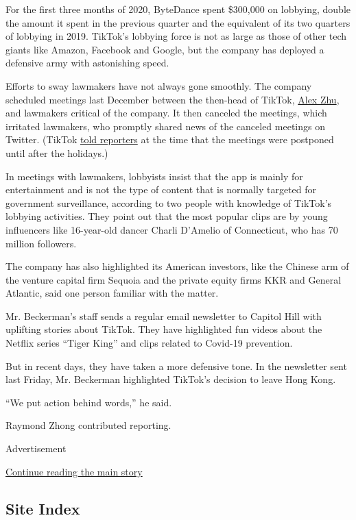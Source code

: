 For the first three months of 2020, ByteDance spent \$300,000 on
lobbying, double the amount it spent in the previous quarter and the
equivalent of its two quarters of lobbying in 2019. TikTok's lobbying
force is not as large as those of other tech giants like Amazon,
Facebook and Google, but the company has deployed a defensive army with
astonishing speed.

Efforts to sway lawmakers have not always gone smoothly. The company
scheduled meetings last December between the then-head of TikTok,
\href{https://www.nytimes3xbfgragh.onion/2019/11/18/technology/tiktok-alex-zhu-interview.html}{Alex
Zhu}, and lawmakers critical of the company. It then canceled the
meetings, which irritated lawmakers, who promptly shared news of the
canceled meetings on Twitter. (TikTok
\href{https://www.washingtonpost.com/technology/2019/12/09/tiktok-leader-postpones-trip-washington-meet-with-members-congress/}{told
reporters} at the time that the meetings were postponed until after the
holidays.)

In meetings with lawmakers, lobbyists insist that the app is mainly for
entertainment and is not the type of content that is normally targeted
for government surveillance, according to two people with knowledge of
TikTok's lobbying activities. They point out that the most popular clips
are by young influencers like 16-year-old dancer Charli D'Amelio of
Connecticut, who has 70 million followers.

The company has also highlighted its American investors, like the
Chinese arm of the venture capital firm Sequoia and the private equity
firms KKR and General Atlantic, said one person familiar with the
matter.

Mr. Beckerman's staff sends a regular email newsletter to Capitol Hill
with uplifting stories about TikTok. They have highlighted fun videos
about the Netflix series ``Tiger King'' and clips related to Covid-19
prevention.

But in recent days, they have taken a more defensive tone. In the
newsletter sent last Friday, Mr. Beckerman highlighted TikTok's decision
to leave Hong Kong.

``We put action behind words,'' he said.

Raymond Zhong contributed reporting.

Advertisement

\protect\hyperlink{after-bottom}{Continue reading the main story}

\hypertarget{site-index}{%
\subsection{Site Index}\label{site-index}}

